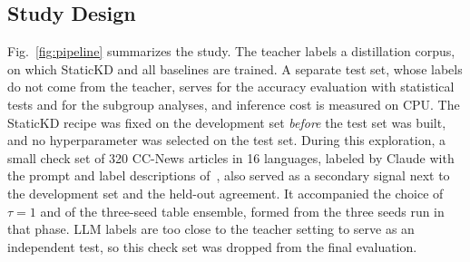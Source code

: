 \subsection{Study Design}
Fig.~\ref{fig:pipeline} summarizes the study. The teacher labels a distillation corpus, on which StaticKD and all baselines are trained. A separate test set, whose labels do not come from the teacher, serves for the accuracy evaluation with statistical tests and for the subgroup analyses, and inference cost is measured on CPU. The StaticKD recipe was fixed on the development set \emph{before} the test set was built, and no hyperparameter was selected on the test set. During this exploration, a small check set of 320 CC-News articles in 16 languages, labeled by Claude with the prompt and label descriptions of~\cite{kuzman2025llm}, also served as a secondary signal next to the development set and the held-out agreement. It accompanied the choice of $\tau=1$ and of the three-seed table ensemble, formed from the three seeds run in that phase. LLM labels are too close to the teacher setting to serve as an independent test, so this check set was dropped from the final evaluation.

